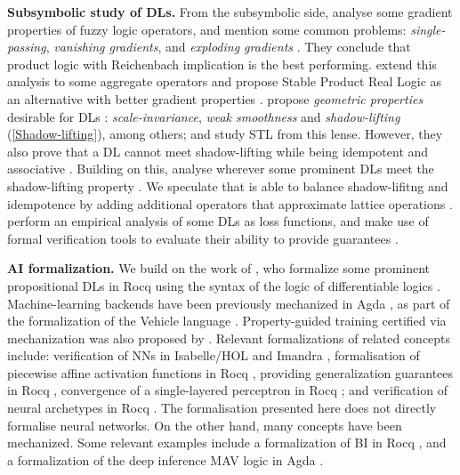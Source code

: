 \textbf{Subsymbolic study of DLs.} From the subsymbolic side, \citeauthor{van2022analyzing} analyse some gradient properties of fuzzy logic operators, and mention some common problems: \emph{single-passing}, \emph{vanishing gradients}, and \emph{exploding gradients} \cite{van2022analyzing}. They conclude that product logic with Reichenbach implication is the best performing. \citeauthor{badreddine2022logic} extend this analysis to some aggregate operators and propose Stable Product Real Logic as an alternative with better gradient properties \citep{badreddine2022logic}. \citeauthor{varnai2020robustness} propose \emph{geometric properties} desirable for DLs \citep{varnai2020robustness}:  \emph{scale-invariance}, \emph{weak smoothness} and \emph{shadow-lifting} (\cref{Shadow-lifting}), among others;  and study STL \citep{varnai2020robustness} from this lense. However, they also prove that a DL cannot meet shadow-lifting while being idempotent and associative \citep{varnai2020robustness}. Building on this, \citeauthor{affeldt2024taming} analyse wherever some prominent DLs  meet the shadow-lifting property \citep{affeldt2024taming, varnai2020robustness}. We speculate that \citeauthor{capucci2024quantifiers} is able to balance shadow-lifitng and idempotence by adding additional operators that approximate lattice operations \citep{capucci2024quantifiers}. \citeauthor{FLINKOW2025103280} perform an empirical analysis of some DLs as loss functions, and make use of formal verification tools to evaluate their ability to provide guarantees \citep{FLINKOW2025103280}. 

\textbf{AI formalization.} We build on the work of \citeauthor{affeldt2024taming}, who formalize some prominent propositional DLs in Rocq \citep{affeldt2024taming} using the syntax of the logic of differentiable logics \cite{slusarz2023logic}. Machine-learning backends have been previously mechanized in Agda \citep{agdaDL}, as part of the formalization of the Vehicle language \citep{vehicle}.  Property-guided training certified via mechanization was also proposed by \citeauthor{chevallier2022constrainedtrainingneuralnetworks} \citep{chevallier2022constrainedtrainingneuralnetworks}. Relevant formalizations of \SuAI{} related concepts include: verification of NNs in Isabelle/HOL \citep{brucker2023verifying} and Imandra \citep{desmartin2022checkinn}, formalisation of piecewise affine activation functions in Rocq \citep{aleksandrov2023formalizing}, providing generalization guarantees in Rocq \citep{bagnall2019certifying}, convergence of a single-layered perceptron in Rocq \citep{murphy2017verified}; and verification of neural archetypes in Rocq \citep{DeMaria2021}. The formalisation presented here does not directly formalise neural networks. On the other hand, many \SiAI{} concepts have been mechanized. Some relevant examples include a formalization of BI in Rocq \citep{10.1145/3497775.3503690}, and a formalization of the deep inference MAV logic in Agda \citep{Atkey2024}. 
